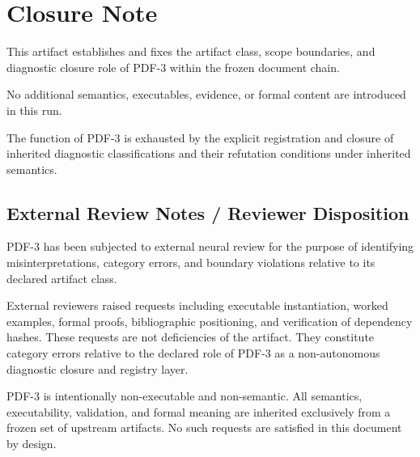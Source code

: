 ﻿\section{Closure Note}

This artifact establishes and fixes the artifact class, scope boundaries,
and diagnostic closure role of PDF-3 within the frozen document chain.

No additional semantics, executables, evidence, or formal content are introduced
in this run.

The function of PDF-3 is exhausted by the explicit registration and closure
of inherited diagnostic classifications and their refutation conditions
under inherited semantics.

\subsection*{External Review Notes / Reviewer Disposition}

PDF-3 has been subjected to external neural review for the purpose of identifying
misinterpretations, category errors, and boundary violations relative to its
declared artifact class.

External reviewers raised requests including executable instantiation,
worked examples, formal proofs, bibliographic positioning, and verification
of dependency hashes. These requests are not deficiencies of the artifact.
They constitute category errors relative to the declared role of PDF-3 as a
non-autonomous diagnostic closure and registry layer.

PDF-3 is intentionally non-executable and non-semantic. All semantics,
executability, validation, and formal meaning are inherited exclusively from
a frozen set of upstream artifacts. No such requests are satisfied in this
document by design.
